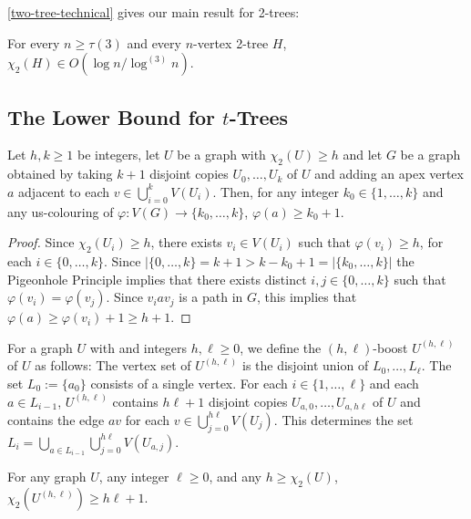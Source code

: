 \documentclass[kpfonts]{patmorin}
\newcommand{\uqs}{\chi_2}
\begin{document}
\cref{two-tree-technical} gives our main result for 2-trees:

\begin{thm}
    For every $n\ge \tau(3)$ and every $n$-vertex 2-tree $H$, $\uqs(H)\in O(\log n/\log^{(3)} n)$.
\end{thm}














\subsection{The Lower Bound for $t$-Trees}

\begin{lem}\label{apex-graph}
    Let $h,k\ge 1$ be integers, let $U$ be a graph with $\uqs(U)\ge h$ and let $G$ be a graph obtained by taking $k+1$ disjoint copies $U_0,\ldots,U_k$ of $U$ and adding an apex vertex $a$ adjacent to each $v\in\bigcup_{i=0}^k V(U_i)$.  Then, for any integer $k_0\in \{1,\ldots,k\}$ and any us-colouring of $\varphi:V(G)\to\{k_0,\ldots,k\}$, $\varphi(a) \ge k_0+1$.
\end{lem}

\begin{proof}
    Since $\uqs(U_i)\ge h$, there exists $v_i\in V(U_i)$ such that $\varphi(v_i)\ge h$, for each $i\in\{0,\ldots,k\}$.  Since $|\{0,\ldots,k\}=k+1>k-k_0+1=|\{k_0,\ldots,k\}|$ the Pigeonhole Principle implies that there exists distinct $i,j\in\{0,\ldots,k\}$ such that $\varphi(v_i)=\varphi(v_j)$.  Since $v_i a v_j$ is a path in $G$, this implies that $\varphi(a)\ge \varphi(v_i)+1\ge h+1$.
\end{proof}

For a graph $U$ with and integers $h,\ell\ge 0$, we define the $(h,\ell)$-boost $U^{(h,\ell)}$ of $U$ as follows: The vertex set of $U^{(h,\ell)}$ is the disjoint union of $L_0,\ldots,L_\ell$.  The set $L_0:=\{a_0\}$ consists of a single vertex. For each $i\in\{1,\ldots,\ell\}$ and each $a\in L_{i-1}$, $U^{(h,\ell)}$ contains $h\ell+1$ disjoint copies $U_{a,0},\ldots,U_{a,h\ell}$ of $U$ and contains the edge $av$ for each $v\in\bigcup_{j=0}^{h\ell} V(U_j)$.  This determines the set $L_i=\bigcup_{a\in L_{i-1}}\bigcup_{j=0}^{h\ell} V(U_{a,j})$.

\begin{lem}\label{boost}
    For any graph $U$, any integer $\ell\ge 0$, and any $h\ge\uqs(U)$, $\uqs(U^{(h,\ell)})\ge h\ell +1$.
\end{lem}
\end{document}
